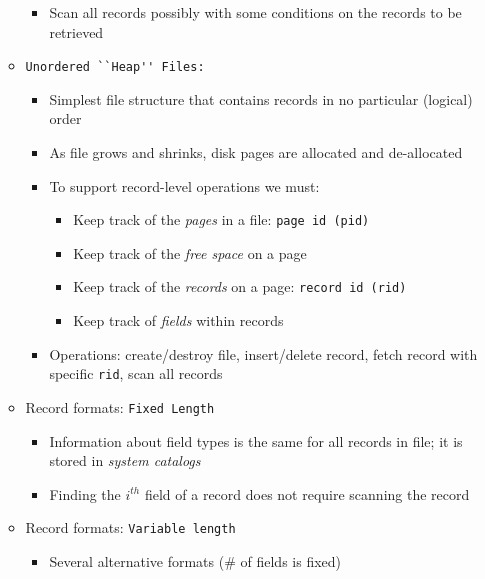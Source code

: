 \documentclass[landscape,8pt]{extarticle}
\newcommand{\code}{\lstinline}
\begin{document}
\begin{multicols}{5}
\begin{itemize}
\begin{itemize}
\begin{itemize}
                            \item Scan all records possibly with some conditions on the records to be retrieved
                        \end{itemize}
                  \item \code{Unordered ``Heap'' Files:}
                        \begin{itemize}
                            \item Simplest file structure that contains records in no particular (logical) order
                            \item As file grows and shrinks, disk pages are allocated and de-allocated
                            \item To support record-level operations we must:
                                  \begin{itemize}
                                      \item Keep track of the \emph{pages} in a file: \code{page id (pid)}
                                      \item Keep track of the \emph{free space} on a page
                                      \item Keep track of the \emph{records} on a page: \code{record id (rid)}
                                      \item Keep track of \emph{fields} within records
                                  \end{itemize}
                            \item Operations: create/destroy file, insert/delete record, fetch record with specific \code{rid}, scan all records
                        \end{itemize}
                  \item Record formats: \code{Fixed Length}
                        \begin{itemize}
                            \item Information about field types is the same for all records in file; it is stored in \emph{system catalogs}
                            \item Finding the $i^{th}$ field of a record does not require scanning the record
                        \end{itemize}
                  \item Record formats: \code{Variable length}
                        \begin{itemize}
                            \item Several alternative formats (\# of fields is fixed)

\end{itemize}
\end{itemize}
\end{itemize}
\end{multicols}
\end{document}

